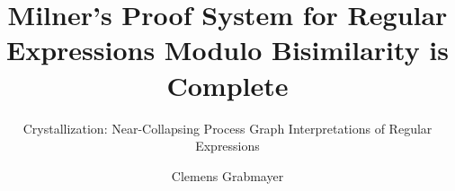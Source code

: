 \documentclass[sigplan,preprint,screen,anonymous,review,submission,timestamp,urlbreakonhyphens,%
                                                                                             ]{acmart}
\begin{document}
\title{Milner's Proof System for Regular Expressions Modulo Bisimilarity is Complete}
\subtitle{Crystallization: Near-Collapsing Process Graph Interpretations of Regular Expressions}

\author{Clemens Grabmayer}







\end{document}
